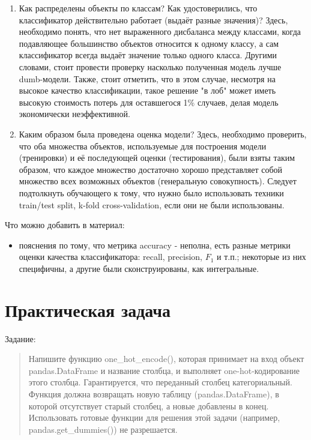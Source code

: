 \documentclass[a4paper,12pt]{article}
\begin{document}
\begin{enumerate}
\item Как распределены объекты по классам? Как удостоверились, что классификатор действительно работает (выдаёт разные значения)? Здесь, необходимо понять, что нет выраженного дисбаланса между классами, когда подавляющее большинство объектов относится к одному классу, а сам классификатор всегда выдаёт значение только одного класса. Другими словами, стоит провести проверку насколько полученная модель лучше dumb-модели. Также, стоит отметить, что в этом случае, несмотря на высокое качество классификации, такое решение "в лоб" может иметь высокую стоимость потерь для оставшегося 1\% случаев, делая модель экономически неэффективной.
\item Каким образом была проведена оценка модели? Здесь, необходимо проверить, что оба множества объектов, используемые для построения модели (тренировки) и её последующей оценки (тестирования), были взяты таким образом, что каждое множество достаточно хорошо представляет собой множество всех возможных объектов (генеральную совокупность). Следует подтолкнуть обучающего к тому, что нужно было использовать техники train/test split, k-fold cross-validation, если они не были использованы.
\end{enumerate}

\medskip

{\color{red} \faLightbulbO} Что можно добавить в материал:
\begin{itemize}
\item пояснения по тому, что метрика accuracy - неполна, есть разные метрики оценки качества классификатора: recall, precision, $F_1$ и т.п.; некоторые из них специфичны, а другие были сконструированы, как интегральные.
\end{itemize}

\section{Практическая задача}

Задание:

\begin{quote}
Напишите функцию one\_hot\_encode(), которая принимает на вход объект pandas.DataFrame и название столбца, и выполняет one-hot-кодирование этого столбца. Гарантируется, что переданный столбец категориальный. Функция должна возвращать новую таблицу (pandas.DataFrame), в которой отсутствует старый столбец, а новые добавлены в конец. Использовать готовые функции для решения этой задачи (например, pandas.get\_dummies()) не разрешается.
\end{quote}
\end{document}
